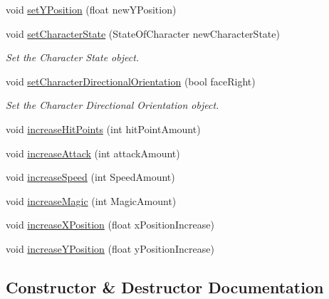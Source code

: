 \begin{DoxyCompactItemize}
\item 
void \mbox{\hyperlink{classCharacterStats_ab1ff93a3f5a89c57092b52ee6df40061}{set\+Y\+Position}} (float new\+Y\+Position)
\item 
void \mbox{\hyperlink{classCharacterStats_ae6624dc6f06e58e635296ad5336cdd70}{set\+Character\+State}} (State\+Of\+Character new\+Character\+State)
\begin{DoxyCompactList}\small\item\em Set the Character State object. \end{DoxyCompactList}\item 
void \mbox{\hyperlink{classCharacterStats_ab5382a7eab127aeb603de23d51877099}{set\+Character\+Directional\+Orientation}} (bool face\+Right)
\begin{DoxyCompactList}\small\item\em Set the Character Directional Orientation object. \end{DoxyCompactList}\item 
void \mbox{\hyperlink{classCharacterStats_a82b3b7fe66687a1210a8ea4c28d86738}{increase\+Hit\+Points}} (int hit\+Point\+Amount)
\item 
void \mbox{\hyperlink{classCharacterStats_a5e9d5271f98b21c335cef1b3efe3ef2c}{increase\+Attack}} (int attack\+Amount)
\item 
void \mbox{\hyperlink{classCharacterStats_ad79f2f74380b875d11849baf1d43eefc}{increase\+Speed}} (int Speed\+Amount)
\item 
void \mbox{\hyperlink{classCharacterStats_aa596a2a54f57b7a637d7be5be50433bb}{increase\+Magic}} (int Magic\+Amount)
\item 
void \mbox{\hyperlink{classCharacterStats_a5f2fe8f102dbed7cfd5ec6960f2a3ca2}{increase\+X\+Position}} (float x\+Position\+Increase)
\item 
void \mbox{\hyperlink{classCharacterStats_a991c8cf5304f633dcbce921b3daebbc4}{increase\+Y\+Position}} (float y\+Position\+Increase)
\end{DoxyCompactItemize}


\subsection{Constructor \& Destructor Documentation}
\mbox{\label{classCharacterStats_a74e13afe074c52cad1c27ea426264540}} 
